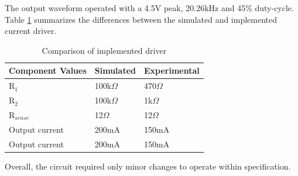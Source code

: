 The output waveform operated with a 4.5V peak, 20.26kHz and 45\% duty-cycle. Table \ref{tab:currentdriver} summarizes the differences between the simulated and implemented current driver.  


\begin{table}[H]
	\centering
	\caption{Comparison of implemented driver}
	\label{tab:currentdriver}
	\begin{tabular}{|l|l|l|}
		\hline
		Component Values & Simulated  & Experimental \\ \hline
		R$_1$            & 100k$\Omega$      & 470$\Omega$        \\ \hline
		R$_2$            & 100k$\Omega$      & 1k$\Omega$      \\ \hline
		R$_{sense}$      & 12$\Omega$ & 12$\Omega$   \\ \hline
		Output current   & 200mA       & 150mA       \\ \hline
		Output current   & 200mA       & 150mA      \\ \hline
	\end{tabular}
\end{table}

Overall, the circuit required only minor changes to operate within specification.

